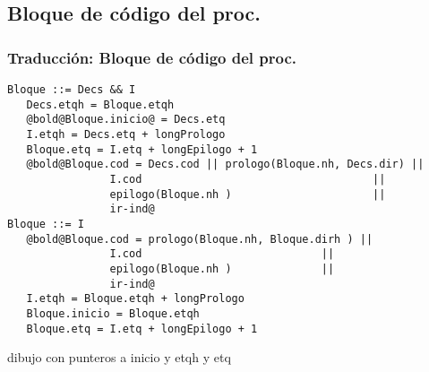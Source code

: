 \documentclass[hyperref={pdfpagelabels=false},tree-dvips,compress]{beamer}
\begin{document}
\subsection{Bloque de código del proc.}
\begin{frame}[fragile]
\frametitle{Traducción: Bloque de código del proc.}

\begin{lstlisting}[style=gramaticas,basicstyle=\scriptsize\ttfamily,mathescape]
Bloque ::= Decs && I
   Decs.etqh = Bloque.etqh
   @bold@Bloque.inicio@ = Decs.etq
   I.etqh = Decs.etq + longPrologo
   Bloque.etq = I.etq + longEpilogo + 1
   @bold@Bloque.cod = Decs.cod || prologo(Bloque.nh, Decs.dir) ||
                I.cod                                    ||
                epilogo(Bloque.nh )                      ||
                ir-ind@
Bloque ::= I
   @bold@Bloque.cod = prologo(Bloque.nh, Bloque.dirh ) ||
                I.cod                            ||
                epilogo(Bloque.nh )              ||
                ir-ind@
   I.etqh = Bloque.etqh + longPrologo
   Bloque.inicio = Bloque.etqh
   Bloque.etq = I.etq + longEpilogo + 1
\end{lstlisting}

	dibujo con punteros a inicio y etqh y etq


\end{frame}
\end{document}
